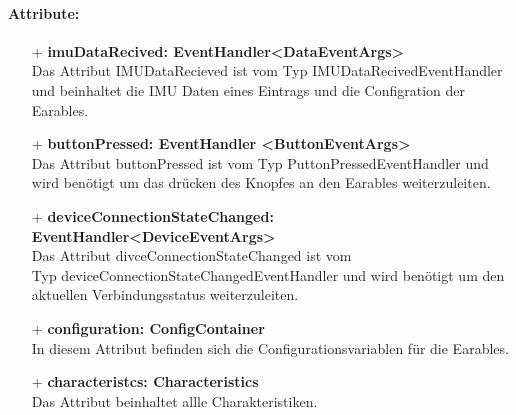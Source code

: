\documentclass[a4paper,12pt]{article}
\begin{document}
\paragraph{Attribute:}
\begin{itemize}
	\item[+] \textbf{imuDataRecived: EventHandler<DataEventArgs>}\\Das Attribut IMUDataRecieved ist vom Typ IMUDataRecivedEventHandler und beinhaltet die IMU Daten eines Eintrags und die Configration der Earables.
	\item[+] \textbf{buttonPressed: EventHandler <ButtonEventArgs>}\\ Das Attribut buttonPressed ist vom Typ PuttonPressedEventHandler und wird benötigt um das drücken des Knopfes an den Earables weiterzuleiten.
	\item[+] \textbf{deviceConnectionStateChanged: EventHandler<DeviceEventArgs>}\\ Das Attribut divceConnectionStateChanged ist vom \\Typ deviceConnectionStateChangedEventHandler und wird benötigt um den aktuellen Verbindungsstatus weiterzuleiten.
	\item[+] \textbf{configuration: ConfigContainer}\\ In diesem Attribut befinden sich die Configurationsvariablen für die Earables.
	\item[+] \textbf{characteristcs: Characteristics}\\ Das Attribut beinhaltet allle Charakteristiken.
\end{itemize}
\end{document}
